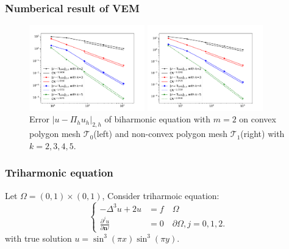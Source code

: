 \documentclass[notheorems,serif]{beamer}
\begin{document}
\begin{CJK}{UTF8}{gkai}
\begin{frame}
  \frametitle{Numberical result of VEM}
\begin{figure}[htbp]
\centering
\begin{minipage}[t]{0.49\linewidth}
\centering
\includegraphics[width=5cm]{../figures/H2_convex.pdf}
\end{minipage}%
\begin{minipage}[t]{0.49\linewidth}
\centering
\includegraphics[width=5cm]{../figures/H2_nonconvex.pdf}
\end{minipage}%
\centering
\caption{Error $|u - \Pi_h u_h|_{2, h}$ of biharmonic 
    equation with $m=2$ on convex polygon mesh $\mathcal T_0$(left) 
and non-convex polygon mesh $\mathcal T_1$(right) with $k = 2, 3, 4, 5$.}
\label{fig:H2error}
\end{figure} 
\end{frame}

\begin{frame}
  \frametitle{Triharmonic equation}
  Let $\Omega = (0, 1)\times(0, 1)$, Consider triharmoic equation:
  $$
  \left\{
  \begin{aligned}
      -\Delta^3 u + 2u & = f \quad \Omega\\
      \frac{\partial^j u}{\partial \boldsymbol{n}^j} & = 0 \quad \partial\Omega,
      j = 0, 1, 2.
  \end{aligned}
  \right.
  $$
  with true solution $u = \sin^3(\pi x)\sin^3(\pi y)$.


\end{frame}
\end{CJK}
\end{document}
